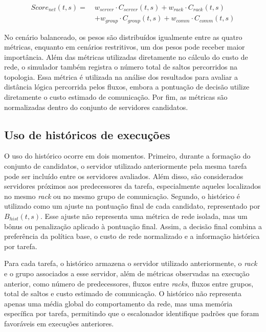 \documentclass[12pt]{article}
\begin{document}
\begin{equation}
\begin{split}
Score_{net}(t,s) =\ & w_{server} \cdot C_{server}(t,s) + w_{rack} \cdot C_{rack}(t,s) \\
& + w_{group} \cdot C_{group}(t,s) + w_{comm} \cdot C_{comm}(t,s)
\end{split}
\label{eq:score_net}
\end{equation}


No cenário balanceado, os pesos são distribuídos igualmente entre as quatro métricas, enquanto em cenários restritivos, um dos pesos pode receber maior importância. 
%
Além das métricas utilizadas diretamente no cálculo do custo de rede, o simulador também registra o número total de saltos percorridos na topologia. Essa métrica é utilizada na análise dos resultados para avaliar a distância lógica percorrida pelos fluxos, embora a pontuação de decisão utilize diretamente o custo estimado de comunicação.
%
Por fim, as métricas são normalizadas dentro do conjunto de servidores candidatos. 

\subsection{Uso de históricos de execuções}
\label{subsec:uso_historico}

O uso do histórico ocorre em dois momentos. 
%
Primeiro, durante a formação do conjunto de candidatos, o servidor utilizado anteriormente pela mesma tarefa pode ser incluído entre os servidores avaliados.
%
Além disso, são considerados servidores próximos aos predecessores da tarefa, especialmente aqueles localizados no mesmo \textit{rack} ou no mesmo grupo de comunicação. 
%
Segundo, o histórico é utilizado como um ajuste na pontuação final de cada candidato, representado por $B_{hist}(t,s)$.
%
Esse ajuste não representa uma métrica de rede isolada, mas um bônus ou penalização aplicado à pontuação final. 
%
Assim, a decisão final combina a preferência da política base, o custo de rede normalizado e a informação histórica por tarefa.

Para cada tarefa, o histórico armazena o servidor utilizado anteriormente, o \textit{rack} e o grupo associados a esse servidor, além de métricas observadas na execução anterior, como número de predecessores, fluxos entre \textit{racks}, fluxos entre grupos, total de saltos e custo estimado de comunicação. 
%
O histórico não representa apenas uma média global do comportamento da rede, mas uma memória específica por tarefa, permitindo que o escalonador identifique padrões que foram favoráveis em execuções anteriores.
\end{document}
